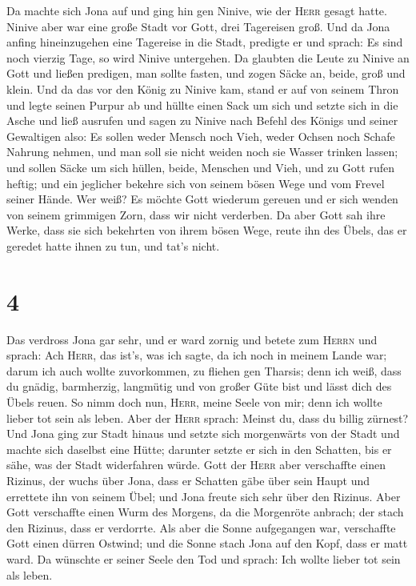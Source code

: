  Da machte sich Jona auf und ging hin gen Ninive, wie der
\textsc{Herr} gesagt hatte. Ninive aber war eine große Stadt vor Gott,
drei Tagereisen groß.  Und da Jona anfing hineinzugehen
eine Tagereise in die Stadt, predigte er und sprach: Es sind noch
vierzig Tage, so wird Ninive untergehen.  Da glaubten die
Leute zu Ninive an Gott und ließen predigen, man sollte fasten, und
zogen Säcke an, beide, groß und klein.  Und da das vor den
König zu Ninive kam, stand er auf von seinem Thron und legte seinen
Purpur ab und hüllte einen Sack um sich und setzte sich in die Asche
 und ließ ausrufen und sagen zu Ninive nach Befehl des
Königs und seiner Gewaltigen also: Es sollen weder Mensch noch Vieh,
weder Ochsen noch Schafe Nahrung nehmen, und man soll sie nicht weiden
noch sie Wasser trinken lassen;  und sollen Säcke um sich
hüllen, beide, Menschen und Vieh, und zu Gott rufen heftig; und ein
jeglicher bekehre sich von seinem bösen Wege und vom Frevel seiner
Hände.  Wer weiß? Es möchte Gott wiederum gereuen und er
sich wenden von seinem grimmigen Zorn, dass wir nicht verderben.
 Da aber Gott sah ihre Werke, dass sie sich bekehrten von
ihrem bösen Wege, reute ihn des Übels, das er geredet hatte ihnen zu
tun, und tat's nicht.

\hypertarget{section-3}{%
\section{4}\label{section-3}}

 Das verdross Jona gar sehr, und er ward zornig
 und betete zum \textsc{Herrn} und sprach: Ach
\textsc{Herr}, das ist's, was ich sagte, da ich noch in meinem Lande
war; darum ich auch wollte zuvorkommen, zu fliehen gen Tharsis; denn ich
weiß, dass du gnädig, barmherzig, langmütig und von großer Güte bist und
lässt dich des Übels reuen.  So nimm doch nun,
\textsc{Herr}, meine Seele von mir; denn ich wollte lieber tot sein als
leben.  Aber der \textsc{Herr} sprach: Meinst du, dass du
billig zürnest?  Und Jona ging zur Stadt hinaus und setzte
sich morgenwärts von der Stadt und machte sich daselbst eine Hütte;
darunter setzte er sich in den Schatten, bis er sähe, was der Stadt
widerfahren würde.  Gott der \textsc{Herr} aber
verschaffte einen Rizinus, der wuchs über Jona, dass er Schatten gäbe
über sein Haupt und errettete ihn von seinem Übel; und Jona freute sich
sehr über den Rizinus.  Aber Gott verschaffte einen Wurm
des Morgens, da die Morgenröte anbrach; der stach den Rizinus, dass er
verdorrte.  Als aber die Sonne aufgegangen war,
verschaffte Gott einen dürren Ostwind; und die Sonne stach Jona auf den
Kopf, dass er matt ward. Da wünschte er seiner Seele den Tod und sprach:
Ich wollte lieber tot sein als leben.

